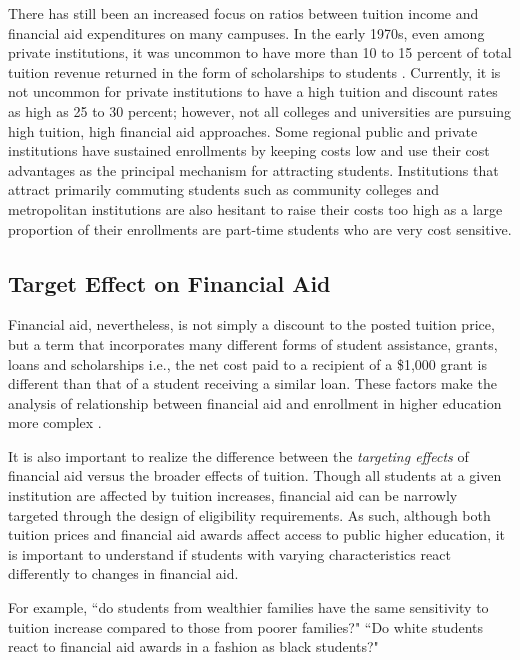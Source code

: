 \documentclass[12pt,english]{report}
\begin{document}
There has still been an increased focus on ratios between tuition income and financial aid expenditures on many campuses. In the early 1970s, even among private institutions, it was uncommon to have more than 10 to 15 percent of total tuition revenue returned in the form of scholarships to students \citep{Hossler1998}. Currently, it is not uncommon for private institutions to have a high tuition and discount rates as high as 25 to 30 percent; however, not all colleges and universities are pursuing high tuition, high financial aid approaches. Some regional public and private institutions have sustained enrollments by keeping costs low and use their cost advantages as the principal mechanism for attracting students. Institutions that attract primarily commuting students such as community colleges and metropolitan institutions are also hesitant to raise their costs too high as a large proportion of their enrollments are part-time students who are very cost sensitive.

\subsection{Target Effect on Financial Aid}
Financial aid, nevertheless, is not simply a discount to the posted tuition price, but a term that incorporates many different forms of student assistance, grants, loans and scholarships i.e., the net cost paid to a recipient of a \$1,000 grant is different than that of a student receiving a similar loan. These factors make the analysis of relationship between financial aid and enrollment in higher education more complex \citep{Heller1997}.
% 
% 

It is also important to realize the difference between the \textit{targeting effects}  of financial aid versus the broader effects of tuition. Though all students at a given institution are affected by tuition increases, financial aid can be narrowly targeted through the design of eligibility requirements.  As such, although both tuition prices and financial aid awards affect access to public higher education, it is important to understand if students with varying characteristics react differently to changes in financial aid.

For example, ``do students from wealthier families have the same sensitivity to tuition increase compared to those from poorer families?"  ``Do white students react to financial aid awards in a fashion as black students?"
\end{document}
